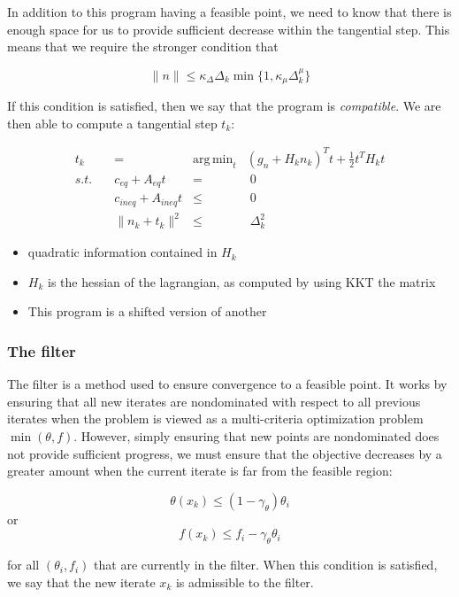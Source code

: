 \documentclass{article}
\DeclareMathOperator*{\argmin}{arg\,min}
\begin{document}
In addition to this program having a feasible point, we need to know that there is enough space for us to provide sufficient decrease within the tangential step. This means that we require the stronger condition that

$$\|n\|\le \kappa_{\Delta} \Delta_k \min \{1, \kappa_{\mu}\Delta_k^{\mu}\}$$

If this condition is satisfied, then we say that the program is \emph{compatible}. We are then able to compute a tangential step $t_k$:

\begin{align*}
t_k &=& \argmin_t           & (g_n+H_kn_k)^Tt + \frac 1 2 t^T H_k t \\
s.t. \quad & c_{eq} + A_{eq}t	&=& \; 0 \\
     & c_{ineq} + A_{ineq}t	&\le& \; 0  \\
     & \| n_k + t_k \|^2 		&\le& \; \Delta_k ^2
\end{align*}

\begin{itemize}
\item quadratic information contained in $H_k$
\item $H_k$ is the hessian of the lagrangian, as computed by using KKT the matrix
\item This program is a shifted version of another
\end{itemize}



\subsubsection{The filter}

The filter is a method used to ensure convergence to a feasible point.
It works by ensuring that all new iterates are nondominated with respect to all previous iterates when the problem is viewed as a multi-criteria optimization problem $\min (\theta, f)$. However, simply ensuring that new points are nondominated does not provide sufficient progress, we must ensure that the objective decreases by a greater amount when the current iterate is far from the feasible region:

\[
\theta(x_k) \le (1-\gamma_{\theta})\theta_i
\]
or
\[
f(x_k) \le f_i -\gamma_{\theta}\theta_i
\]

for all $(\theta_i, f_i)$ that are currently in the filter.
When this condition is satisfied, we say that the new iterate $x_k$ is admissible to the filter.
\end{document}
